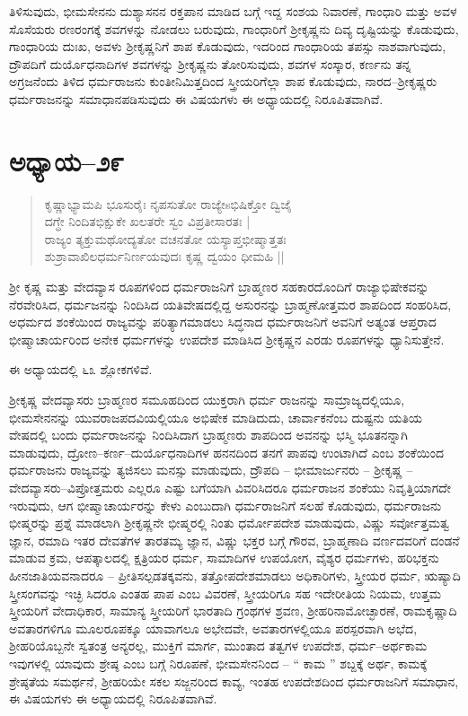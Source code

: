 ತಿಳಿಸುವುದು, ಭೀಮಸೇನನು ದುಶ್ಯಾಸನನ ರಕ್ತಪಾನ ಮಾಡಿದ ಬಗ್ಗೆ ಇದ್ದ ಸಂಶಯ ನಿವಾರಣೆ, ಗಾಂಧಾರಿ ಮತ್ತು ಅವಳ ಸೊಸೆಯರು ರಣರಂಗಕ್ಕೆ ಶವಗಳನ್ನು ನೋಡಲು ಬರುವುದು, ಗಾಂಧಾರಿಗೆ ಶ‍್ರೀಕೃಷ್ಣನು ದಿವ್ಯ ದೃಷ್ಟಿಯನ್ನು ಕೊಡುವುದು, ಗಾಂಧಾರಿಯ ದುಃಖ, ಅವಳು ಶ‍್ರೀಕೃಷ್ಣನಿಗೆ ಶಾಪ ಕೊಡುವುದು, ಇದರಿಂದ ಗಾಂಧಾರಿಯ ತಪಸ್ಸು ನಾಶವಾಗುವುದು, ದ್ರೌಪದಿಗೆ ದುರ್ಯೊಧನಾದಿಗಳ ಶವಗಳನ್ನು ಶ‍್ರೀಕೃಷ್ಣನು ತೋರಿಸುವುದು, ಶವಗಳ ಸಂಸ್ಕಾರ, ಕರ್ಣನು ತನ್ನ ಅಗ್ರಜನೆಂದು ತಿಳಿದ ಧರ್ಮರಾಜನು ಕುಂತೀನಿಮಿತ್ತದಿಂದ ಸ್ತ್ರೀಯರಿಗೆಲ್ಲಾ ಶಾಪ ಕೊಡುವುದು, ನಾರದ–ಶ‍್ರೀಕೃಷ್ಣರು ಧರ್ಮರಾಜನನ್ನು ಸಮಾಧಾನಪಡಿಸುವುದು ಈ ವಿಷಯಗಳು ಈ ಅಧ್ಯಾಯದಲ್ಲಿ ನಿರೂಪಿತವಾಗಿವೆ.


\section{ಅಧ್ಯಾಯ–೨೯}

\begin{verse}
ಕೃಷ್ಣಾಭ್ಯಾಮಪಿ ಭೂಸುರೈಃ ನೃಪಸುತೋ ರಾಜ್ಯೇsಭಿಷಿಕ್ತೋ ದ್ವಿಜೈ\\ ದಗ್ಧೇ ನಿಂದಿತಭಿಕ್ಷುಕೇ ಖಲತರೇ ಸ್ವಂ ವಿಪ್ರತೀಸಾರತಃ |\\ ರಾಜ್ಯಂ ತ್ಯಕ್ತುಮಥೋದ್ಯತೋ ವಚನತೋ ಯಸ್ಯಾಪ್ತಭೀಷ್ಮಾತ್ತತಃ \\ ಶುಶ್ರಾವಾಖಿಲಧರ್ಮನಿರ್ಣಯವುದಃ ಕೃಷ್ಣ ದ್ವಯಂ ಧೀಮಹಿ ||
\end{verse}

ಶ‍್ರೀ ಕೃಷ್ಣ ಮತ್ತು ವೇದವ್ಯಾಸ ರೂಪಗಳಿಂದ ಧರ್ಮರಾಜನಿಗೆ ಬ್ರಾಹ್ಮಣರ ಸಹಕಾರದೊಂದಿಗೆ ರಾಜ್ಯಾಭಿಷೇಕವನ್ನು ನೆರವೇರಿಸಿದ, ಧರ್ಮಜನನ್ನು ನಿಂದಿಸಿದ ಯತಿವೇಷದಲ್ಲಿದ್ದ ಅಸುರನನ್ನು ಬ್ರಾಹ್ಮಣೋತ್ತಮರ ಶಾಪದಿಂದ ಸಂಹರಿಸಿದ, ಅಧರ್ಮದ ಶಂಕೆಯಿಂದ ರಾಜ್ಯವನ್ನು ಪರಿತ್ಯಾಗಮಾಡಲು ಸಿದ್ಧನಾದ ಧರ್ಮರಾಜನಿಗೆ ಅವನಿಗೆ ಅತ್ಯಂತ ಆಪ್ತರಾದ ಭೀಷ್ಮಾಚಾರ್ಯರಿಂದ ಅನೇಕ ಧರ್ಮಗಳನ್ನು ಉಪದೇಶ ಮಾಡಿಸಿದ ಶ‍್ರೀಕೃಷ್ಣನ ಎರಡು ರೂಪಗಳನ್ನು ಧ್ಯಾನಿಸುತ್ತೇನೆ.

ಈ ಅಧ್ಯಾಯದಲ್ಲಿ ೬೩ ಶ್ಲೋಕಗಳಿವೆ.

ಶ‍್ರೀಕೃಷ್ಣ ವೇದವ್ಯಾಸರು ಬ್ರಾಹ್ಮಣರ ಸಮೂಹದಿಂದ ಯುಕ್ತರಾಗಿ ಧರ್ಮ ರಾಜನನ್ನು ಸಾಮ್ರಾಜ್ಯದಲ್ಲಿಯೂ, ಭೀಮಸೇನನನ್ನು ಯುವರಾಜಪದವಿಯಲ್ಲಿಯೂ ಅಭಿಷೇಕ ಮಾಡಿದುದು, ಚಾರ್ವಾಕನೆಂಬ ದುಷ್ಟನು ಯತಿಯ ವೇಷದಲ್ಲಿ ಬಂದು ಧರ್ಮರಾಜನನ್ನು ನಿಂದಿಸಿದಾಗ ಬ್ರಾಹ್ಮಣರು ಶಾಪದಿಂದ ಅವನನ್ನು ಭಸ್ಮಿ ಭೂತನನ್ನಾಗಿ ಮಾಡುವುದು, ದ್ರೋಣ–ಕರ್ಣ–ದುರ್ಯೊಧನಾದಿಗಳ ಹನನದಿಂದ ತನಗೆ ಪಾಪವು ಉಂಟಾಗಿದೆ ಎಂಬ ಶಂಕೆಯಿಂದ ಧರ್ಮರಾಜನು ರಾಜ್ಯವನ್ನು ತ್ಯಜಿಸಲು ಮನಸ್ಸು ಮಾಡುವುದು, ದ್ರೌಪದಿ – ಭೀಮಾರ್ಜುನರು – ಶ‍್ರೀಕೃಷ್ಣ – ವೇದವ್ಯಾಸರು–ವಿಪ್ರೋತ್ತಮರು ಎಲ್ಲರೂ ಎಷ್ಟು ಬಗೆಯಾಗಿ ವಿವರಿಸಿದರೂ ಧರ್ಮರಾಜನ ಶಂಕೆಯು ನಿವೃತ್ತಿಯಾಗದೇ ಇರುವುದು, ಆಗ ಭೀಷ್ಮಾಚಾರ್ಯರನ್ನು ಕೇಳು ಎಂಬುದಾಗಿ ಧರ್ಮರಾಜನಿಗೆ ಸಲಹೆ ಕೊಡುವುದು, ಧರ್ಮರಾಜನು ಭೀಷ್ಮರನ್ನು ಪ್ರಶ್ನೆ ಮಾಡಲಾಗಿ ಶ‍್ರೀಕೃಷ್ಣನೇ ಭೀಷ್ಮರಲ್ಲಿ ನಿಂತು ಧರ್ಮೋಪದೇಶ ಮಾಡುವುದು, ವಿಷ್ಣು ಸರ್ವೋತ್ತಮತ್ವ ಜ್ಞಾನ, ರಮಾದಿ ಇತರ ದೇವತೆಗಳ ತಾರತಮ್ಯ ಜ್ಞಾನ, ವಿಷ್ಣು ಭಕ್ತರ ಬಗ್ಗೆ ಗೌರವ, ಬ್ರಾಹ್ಮಣಾದಿ ವರ್ಣದವರಿಗೆ ದಂಡನೆ ಮಾಡುವ ಕ್ರಮ, ಆಪತ್ಕಾಲದಲ್ಲಿ ಕ್ಷತ್ರಿಯರ ಧರ್ಮ, ಸಾಮಾದಿಗಳ ಉಪಯೋಗ, ವೈಶ್ಯರ ಧರ್ಮಗಳು, ಹರಿಭಕ್ತನು ಹೀನಜಾತಿಯವನಾದರೂ – ಪ್ರೀತಿಸಲ್ಪಡತಕ್ಕವನು, ತತ್ತೋಪದೇಶಮಾಡಲು ಅಧಿಕಾರಿಗಳು, ಸ್ತ್ರೀಯರ ಧರ್ಮ, ಋಷ್ಯಾದಿ ಸ್ತ್ರೀಸಂಗವನ್ನು ಇಚ್ಛಿ ಸಿದರೂ ಎಂತಹ ಪಾಪ ಎಂಬ ವಿವರಣೆ, ಸ್ತ್ರೀಯರಿಗೂ ಸಹ ಇದೇರೀತಿಯ ನಿಯಮ, ಉತ್ತಮ ಸ್ತ್ರೀಯರಿಗೆ ವೇದಾಧಿಕಾರ, ಸಾಮಾನ್ಯ ಸ್ತ್ರೀಯರಿಗೆ ಭಾರತಾದಿ ಗ್ರಂಥಗಳ ಶ್ರವಣ, ಶ‍್ರೀಹರಿನಾಮೋಚ್ಛಾರಣೆ, ರಾಮಕೃಷ್ಣಾದಿ ಅವತಾರಗಳಿಗೂ ಮೂಲರೂಪಕ್ಕೂ ಯಾವಾಗಲೂ ಅಭೇದವೇ, ಅವತಾರಗಳಲ್ಲಿಯೂ ಪರಸ್ಪರವಾಗಿ ಅಭೆದ, ಶ‍್ರೀಹರಿಯೊಬ್ಬನೇ ಸ್ವತಂತ್ರ ಅನ್ಯರಲ್ಲ, ಮುಕ್ತಿಗೆ ಮಾರ್ಗ, ಮುಂತಾದ ತತ್ವಗಳ ಉಪದೇಶ, ಧರ್ಮ–ಅರ್ಥಕಾಮ ಇವುಗಳಲ್ಲಿ ಯಾವುದು ಶ್ರೇಷ್ಠ ಎಂಬ ಬಗ್ಗೆ ನಿರೂಪಣೆ, ಭೀಮಸೇನನಿಂದ – “ ಕಾಮ ” ಶಬ್ದಕ್ಕೆ ಅರ್ಥ, ಕಾಮಕ್ಕೆ ಶ್ರೇಷ್ಠತೆಯ ಸಮರ್ಥನೆ, ಶ‍್ರೀಹರಿಯೇ ಸಕಲ ಸಜ್ಜನರಿಂದ ಕಾವ್ಯ, ಇಂತಹ ಉಪದೇಶದಿಂದ ಧರ್ಮರಾಜನಿಗೆ ಸಮಾಧಾನ, ಈ ವಿಷಯಗಳು ಈ ಅಧ್ಯಾಯದಲ್ಲಿ ನಿರೂಪಿತವಾಗಿವೆ.



